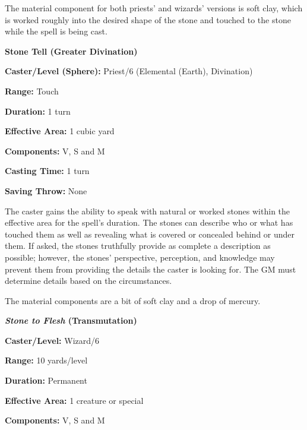 \begin{multicols}{2}
The material component for both priests' and wizards' versions is soft clay, which is worked roughly into the desired shape of the stone and touched to the stone while the spell is being cast.

\vspace{1em}

\noindent
\begin{minipage}{\columnwidth}

\noindent \textbf{Stone Tell (Greater Divination)}

\noindent \textbf{Caster/Level (Sphere):} Priest/6 (Elemental (Earth), Divination)

\noindent \textbf{Range:} Touch

\noindent \textbf{Duration:} 1 turn

\noindent \textbf{Effective Area:} 1 cubic yard

\noindent \textbf{Components:} V, S and M

\noindent \textbf{Casting Time:} 1 turn

\noindent \textbf{Saving Throw:} None

\end{minipage}

The caster gains the ability to speak with natural or worked stones within the effective area for the spell's duration.  The stones can describe who or what has touched them as well as revealing what is covered or concealed behind or under them.  If asked, the stones truthfully provide as complete a description as possible; however, the stones' perspective, perception, and knowledge may prevent them from providing the details the caster is looking for.  The GM must determine details based on the circumstances.

The material components are a bit of soft clay and a drop of mercury.

\vspace{1em}

\noindent
\begin{minipage}{\columnwidth}

\noindent \textbf{\textit{Stone to Flesh} (Transmutation)}

\noindent \textbf{Caster/Level:} Wizard/6

\noindent \textbf{Range:} 10 yards/level

\noindent \textbf{Duration:} Permanent

\noindent \textbf{Effective Area:} 1 creature or special

\noindent \textbf{Components:} V, S and M


\end{minipage}
\end{multicols}
